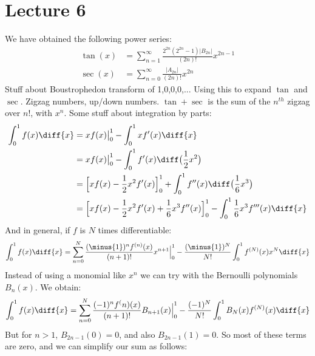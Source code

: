 \documentclass[crop=false,class=book,oneside]{standalone}
\begin{document}
    \section{Lecture 6}
        We have obtained the following power series:
        \begin{align}
            \tan(x)&=\sum_{n=1}^{\infty}
                \frac{2^{2n}(2^{2n}-1)|B_{2n}|}{(2n)!}x^{2n-1}\\
            \sec(x)&=\sum_{n=0}^{\infty}
                \frac{|A_{2n}|}{(2n)!}x^{2n}
        \end{align}
        Stuff about Boustrophedon transform of 1,0,0,0,...
        Using this to expand $\tan$ and $\sec$. Zigzag numbers,
        up/down numbers. $\tan+\sec$ is the sum of the
        $n^{th}$ zigzag over $n!$, with $x^{n}$.
        Some stuff about integration by parts:
        \begin{align}
            \int_{0}^{1}f(x)\diff{x}
            &=xf(x)\big|_{0}^{1}-\int_{0}^{1}xf'(x)\diff{x}\\
            &=xf(x)\big|_{0}^{1}-\int_{0}^{1}
                f'(x)\diff\big(\frac{1}{2}x^{2}\big)\\
            &=\Big[xf(x)-\frac{1}{2}x^{2}f'(x)\Big]_{0}^{1}+
                \int_{0}^{1}f''(x)\diff\big(\frac{1}{6}x^{3}\big)\\
            &=\Big[
                xf(x)-\frac{1}{2}x^{2}f'(x)+\frac{1}{6}x^{3}f''(x)
            \Big]_{0}^{1}-\int_{0}^{1}\frac{1}{6}x^{3}f'''(x)\diff{x}
        \end{align}
        And in general, if $f$ is $N$ times differentiable:
        \begin{equation}
            \int_{0}^{1}f(x)\diff{x}=
            \sum_{n=0}^{N}\frac{(\minus{1})^{n}f^{(n)}(x)}{(n+1)!}x^{n+1}
                \Big|_{0}^{1}-\frac{(\minus{1})^{N}}{N!}\int_{0}^{1}
                    f^{(N)}(x)x^{N}\diff{x}
        \end{equation}
        Instead of using a monomial like $x^{n}$ we can try with the
        Bernoulli polynomials $B_{n}(x)$. We obtain:
        \begin{equation}
            \int_{0}^{1}f(x)\diff{x}=
                \sum_{n=0}^{N}\frac{(-1)^{n}f^(n)(x)}{(n+1)!}B_{n+1}(x)
                \Big|_{0}^{1}-\frac{(-1)^{N}}{N!}\int_{0}^{1}
                B_{N}(x)f^{(N)}(x)\diff{x}
        \end{equation}
        But for $n>1$, $B_{2n-1}(0)=0$, and also
        $B_{2n-1}(1)=0$. So most of these terms are zero, and we can
        simplify our sum as follows:
\end{document}
